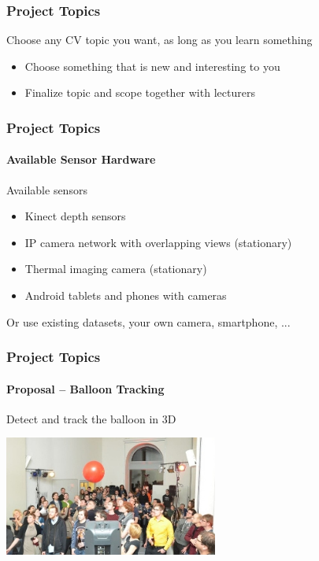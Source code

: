 \documentclass[xetex,professionalfont]{beamer}
\begin{document}

\begin{frame}
\frametitle{Project Topics}

Choose any CV topic you want, as long as you learn something
\begin{itemize}
	\item Choose something that is new and interesting to you
	\item Finalize topic and scope together with lecturers
\end{itemize}

\end{frame}


\begin{frame}
\frametitle{Project Topics}
\framesubtitle{Available Sensor Hardware}

Available sensors
\begin{itemize}
	\item Kinect depth sensors
	\item IP camera network with overlapping views (stationary)
	\item Thermal imaging camera (stationary)
	\item Android tablets and phones with cameras
\end{itemize}

\bigskip
Or use existing datasets, your own camera, smartphone, ...

\end{frame}


\begin{frame}
\frametitle{Project Topics}
\framesubtitle{Proposal -- Balloon Tracking}

Detect and track the balloon in 3D

\bigskip
\begin{center}
	\includegraphics[width=7cm]{figures/balloon.jpg}
\end{center}

\end{frame}
\end{document}
